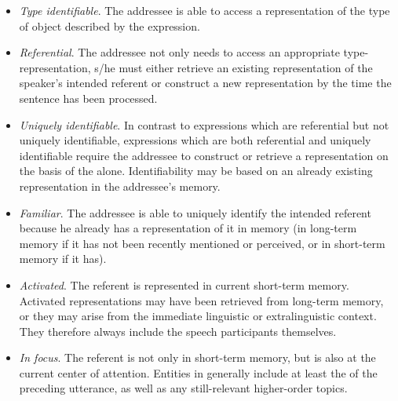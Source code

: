 \begin{itemize}
\item \textit{Type identifiable}. The addressee is able to access a representation of the type of object described by the expression.
\item \textit{Referential}. The addressee not only needs to access an appropriate type-representation, s/he must either retrieve an existing representation of the speaker's intended referent or construct a new representation by the time the sentence has been processed. 
\item\textit{Uniquely identifiable}. In contrast to expressions which are referential but not uniquely identifiable, expressions which are both referential and uniquely identifiable require the addressee to construct or retrieve a representation on the basis of the  alone. Identifiability may be based on an already existing representation in the addressee's memory. 
\item \textit{Familiar}. The addressee is able to uniquely identify the intended referent because he already has a representation of it in memory (in long-term memory if it has not been recently mentioned or perceived, or in short-term memory if it has). 
\item \textit{Activated}. The referent is represented in current short-term memory. Activated representations may have been retrieved from long-term memory, or they may arise from the immediate linguistic or extralinguistic context. They therefore always include the speech participants themselves.
\item \textit{In focus}. The referent is not only in short-term memory, but is also at the current center of attention. Entities in  generally include at least the  of the preceding utterance, as well as any still-relevant higher-order topics.
\end{itemize}
\z

